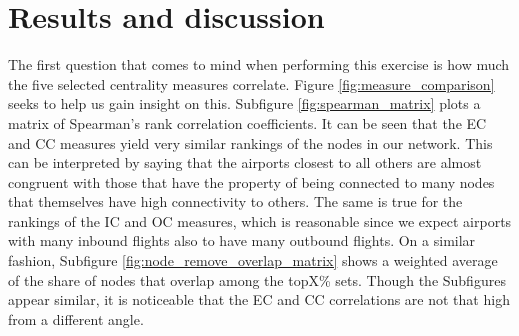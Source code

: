 \documentclass{Template_resources/netsci-project}
\begin{document}
\section{Results and discussion}
The first question that comes to mind when performing this exercise is how much the five selected centrality measures correlate. Figure \ref{fig:measure_comparison} seeks to help us gain insight on this. Subfigure \ref{fig:spearman_matrix} plots a matrix of Spearman's rank correlation coefficients. It can be seen that the EC and CC measures yield very similar rankings of the nodes in our network. This can be interpreted by saying that the airports closest to all others are almost congruent with those that have the property of being connected to many nodes that themselves have high connectivity to others. The same is true for the rankings of the IC and OC measures, which is reasonable since we expect airports with many inbound flights also to have many outbound flights. On a similar fashion, Subfigure \ref{fig:node_remove_overlap_matrix} shows a weighted average of the share of nodes that overlap among the topX\% sets. Though the Subfigures appear similar, it is noticeable that the EC and CC correlations are not that high from a different angle.
\end{document}
